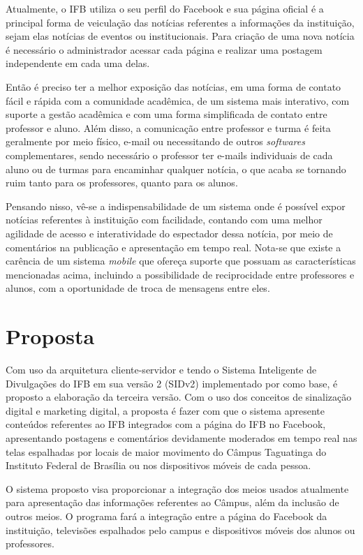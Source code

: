 Atualmente, o IFB utiliza o seu perfil do Facebook e sua página oficial é a principal forma de veiculação das notícias referentes a informações da instituição, sejam elas notícias de eventos ou institucionais. Para criação de uma nova notícia é necessário o administrador acessar cada página e realizar uma postagem independente em cada uma delas. 

Então é preciso ter a melhor exposição das notícias, em uma forma de contato fácil e rápida com a comunidade acadêmica, de um sistema mais interativo, com suporte a gestão acadêmica e com uma forma simplificada de contato entre professor e aluno. Além disso, a comunicação entre professor e turma é feita geralmente por meio físico, e-mail ou necessitando de outros \textit{softwares} complementares, sendo necessário o professor ter e-mails individuais de cada aluno ou de turmas para encaminhar qualquer notícia, o que acaba se tornando ruim tanto para os professores, quanto para os alunos. 

Pensando nisso, vê-se a indispensabilidade de um sistema onde é possível expor notícias referentes à instituição com facilidade, contando com uma melhor agilidade de acesso e interatividade do espectador dessa notícia, por meio de comentários na publicação e apresentação em tempo real. Nota-se que existe a carência de um sistema \textit{mobile} que ofereça suporte que possuam as características mencionadas acima, incluindo a possibilidade de reciprocidade entre professores e alunos, com a oportunidade  de troca de mensagens entre eles.

\section{Proposta}
Com uso da arquitetura cliente-servidor e tendo o  Sistema Inteligente de Divulgações do IFB em sua versão 2 (SIDv2) implementado por \cite{sobrinho2017} como base, é proposto a elaboração da terceira versão. Com o uso dos conceitos de sinalização digital e marketing digital, a proposta é fazer com que o sistema apresente conteúdos referentes ao IFB integrados com a página do IFB no Facebook, apresentando postagens e comentários devidamente moderados em tempo real nas telas espalhadas por locais de maior movimento do Câmpus Taguatinga do Instituto Federal de Brasília ou nos dispositivos móveis de cada pessoa. 

O sistema proposto visa proporcionar a integração dos meios usados atualmente para apresentação das informações referentes ao Câmpus, além da inclusão de outros meios. O programa fará a integração entre a página do Facebook da instituição, televisões espalhados pelo campus e dispositivos móveis dos alunos ou professores.

